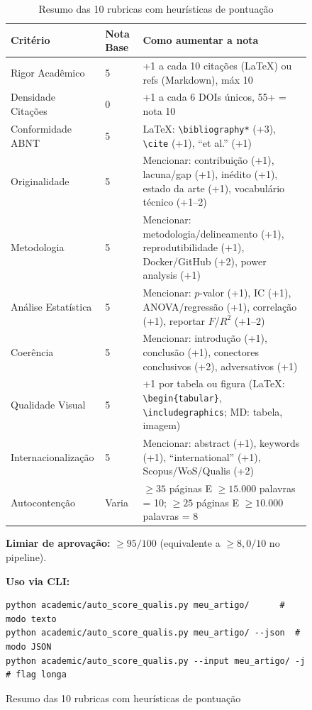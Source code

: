 \begin{figure}
\begin{table}[H]
\centering
\caption{Resumo das 10 rubricas com heurísticas de pontuação}
\label{tab:guia_rapido}
\begin{tabular}{p{2.5cm} p{2cm} p{10cm}}
\toprule
\textbf{Critério} & \textbf{Nota Base} & \textbf{Como aumentar a nota} \\
\midrule
Rigor Acadêmico & 5 & +1 a cada 10 citações (LaTeX) ou refs (Markdown), máx 10 \\
Densidade Citações & 0 & +1 a cada 6 DOIs únicos, 55+ = nota 10 \\
Conformidade ABNT & 5 & LaTeX: \texttt{\textbackslash bibliography*} (+3), \texttt{\textbackslash cite} (+1), ``et al.'' (+1) \\
Originalidade & 5 & Mencionar: contribuição (+1), lacuna/gap (+1), inédito (+1), estado da arte (+1), vocabulário técnico (+1--2) \\
Metodologia & 5 & Mencionar: metodologia/delineamento (+1), reprodutibilidade (+1), Docker/GitHub (+2), power analysis (+1) \\
Análise Estatística & 5 & Mencionar: $p$-valor (+1), IC (+1), ANOVA/regressão (+1), correlação (+1), reportar $F$/$R^2$ (+1--2) \\
Coerência & 5 & Mencionar: introdução (+1), conclusão (+1), conectores conclusivos (+2), adversativos (+1) \\
Qualidade Visual & 5 & +1 por tabela ou figura (LaTeX: \texttt{\textbackslash begin\{tabular\}}, \texttt{\textbackslash includegraphics}; MD: tabela, imagem) \\
Internacionalização & 5 & Mencionar: abstract (+1), keywords (+1), ``international'' (+1), Scopus/WoS/Qualis (+2) \\
Autocontenção & Varia & $\geq 35$ páginas E $\geq 15.000$ palavras = 10; $\geq 25$ páginas E $\geq 10.000$ palavras = 8 \\
\bottomrule
\end{tabular}
\end{table}

\textbf{Limiar de aprovação:} $\geq 95/100$ (equivalente a $\geq 8,0/10$ no pipeline).

\textbf{Uso via CLI:}
\begin{verbatim}
python academic/auto_score_qualis.py meu_artigo/      # modo texto
python academic/auto_score_qualis.py meu_artigo/ --json  # modo JSON
python academic/auto_score_qualis.py --input meu_artigo/ -j  # flag longa
\end{verbatim}


\end{figure}
